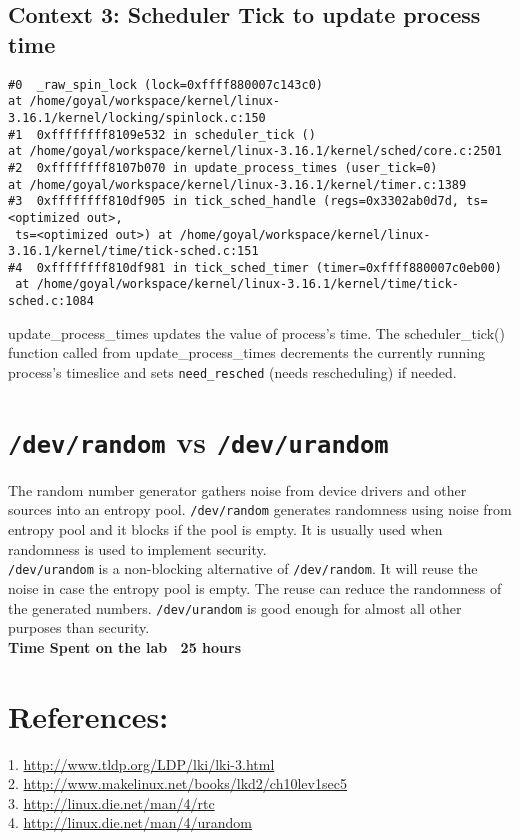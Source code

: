 \documentclass[10pt] {article}
\begin{document}
\subsection{Context 3: Scheduler Tick to update process time}
\begin{lstlisting}
#0  _raw_spin_lock (lock=0xffff880007c143c0) 
at /home/goyal/workspace/kernel/linux-3.16.1/kernel/locking/spinlock.c:150
#1  0xffffffff8109e532 in scheduler_tick () 
at /home/goyal/workspace/kernel/linux-3.16.1/kernel/sched/core.c:2501
#2  0xffffffff8107b070 in update_process_times (user_tick=0) 
at /home/goyal/workspace/kernel/linux-3.16.1/kernel/timer.c:1389
#3  0xffffffff810df905 in tick_sched_handle (regs=0x3302ab0d7d, ts=<optimized out>,
 ts=<optimized out>) at /home/goyal/workspace/kernel/linux-3.16.1/kernel/time/tick-sched.c:151
#4  0xffffffff810df981 in tick_sched_timer (timer=0xffff880007c0eb00)
 at /home/goyal/workspace/kernel/linux-3.16.1/kernel/time/tick-sched.c:1084
\end{lstlisting}

\noindent update\_process\_times updates the value of process's time. The scheduler\_tick() function called from update\_process\_times decrements the currently running process's timeslice and sets \texttt{need\_resched} (needs rescheduling) if needed. \\

\section{\texttt{/dev/random} vs \texttt{/dev/urandom}}

The random number generator gathers noise from device drivers and other sources into an entropy pool. \texttt{/dev/random} generates randomness using noise from entropy pool and it blocks if the pool is empty. It is usually used when randomness is used to implement security. \\
\texttt{/dev/urandom} is a non-blocking alternative of \texttt{/dev/random}. It will reuse the noise in case the entropy pool is empty. The reuse can reduce the randomness of the generated numbers. \texttt{/dev/urandom} is good enough for almost all other purposes than security.\\

\noindent \textbf{Time Spent on the lab ~25 hours} 

\section{References:}
1. \url{http://www.tldp.org/LDP/lki/lki-3.html}  \\
2. \url{http://www.makelinux.net/books/lkd2/ch10lev1sec5} \\
3. \url{http://linux.die.net/man/4/rtc} \\
4. \url{http://linux.die.net/man/4/urandom}
\end{document}

